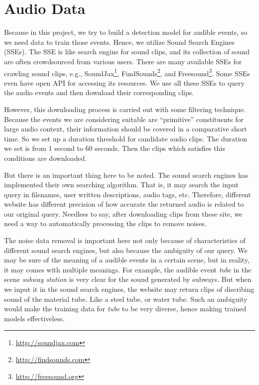 \section{Audio Data}
Because in this project, we try to build a detection model for audible events, so we need data to train those events. 
Hence, we utilize Sound Search Engines (SSEs). 
The SSE is like search engine for sound clips, and its collection of sound are often crowdsourced from various users. 
There are many available SSEs for crawling sound clips, e.g., SoundJax\footnote{\url{http://soundjax.com}}, FindSounds\footnote{\url{http://findsounds.com}}, and Freesound\footnote{\url{http://freesound.org}}. 
Some SSEs even have open API for accessing its resources. 
We use all these SSEs to query the audio events and then download their corresponding clips. 

However, this downloading process is carried out with some filtering technique. 
Because the events we are considering suitable are ``primitive'' constituents for large audio context, their information should be covered in a comparative short time. 
So we set up a duration threshold for candidate audio clips.  
The duration we set is from 1 second to 60 seconds. 
Then the clips which satisfies this conditions are downloaded. 

But there is an important thing here to be noted. 
The sound search engines has implemented their own searching algorithm. 
That is, it may search the input query in filenames, user written descriptions, audio tags, etc. 
Therefore, different website has different precision of how accurate the returned audio is related to our original query. 
Needless to say, after downloading clips from these site, we need a way to automatically processing the clips to remove noises. 

The noise data removal is important here not only because of characteristics of different sound search engines, but also because the ambiguity of our query. 
We may be sure of the meaning of a audible events in a certain scene, but in reality, it may comes with multiple meanings. 
For example, the audible event \textit{tube} in the scene \textit{subway station} is very clear for the sound generated by subways. 
But when we input it in the sound search engines, the website may return clips of discribing sound of the material tube. 
Like a steel tube, or water tube. 
Such an ambiguity would make the training data for \textit{tube} to be very diverse, hence making trained models effectiveless. 

